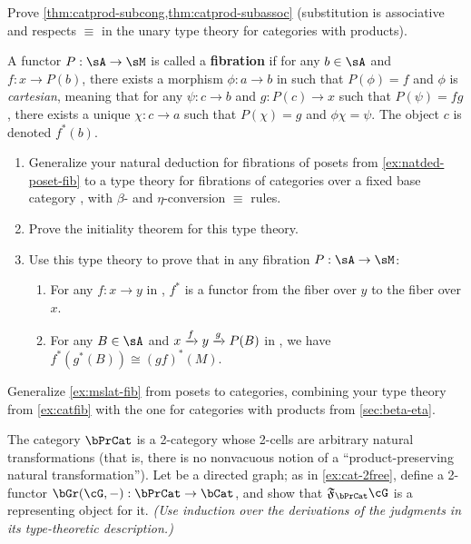 \begin{ex}\label{ex:catprod-subcong-subassoc}
  Prove \cref{thm:catprod-subcong,thm:catprod-subassoc} (substitution is associative and respects $\equiv$ in the unary type theory for categories with products).
\end{ex}

\begin{ex}\label{ex:catfib}
  A functor $P:\sA\to \sM$ is called a \textbf{fibration} if for any $b\in \sA$ and $f:x\to P(b)$, there exists a morphism $\phi:a\to b$ in \sA such that $P(\phi)=f$ and $\phi$ is \emph{cartesian}, meaning that for any $\psi:c\to b$ and $g:P(c)\to x$ such that $P(\psi)=fg$, there exists a unique $\chi:c\to a$ such that $P(\chi)=g$ and $\phi\chi=\psi$.
  The object $c$ is denoted $f^*(b)$.
  \begin{enumerate}
  \item Generalize your natural deduction for fibrations of posets from \cref{ex:natded-poset-fib} to a type theory for fibrations of categories over a fixed base category \sM, with $\beta$- and $\eta$-conversion $\equiv$ rules.
  \item Prove the initiality theorem for this type theory.
  \item Use this type theory to prove that in any fibration $P:\sA\to\sM$:
    \begin{enumerate}
    \item For any $f:x\to y$ in \sM, $f^*$ is a functor from the fiber over $y$ to the fiber over $x$.
    \item For any $B\in \sA$ and $x\xrightarrow{f} y \xrightarrow{g} P(B)$ in \sM, we have $f^*(g^*(B)) \cong (gf)^*(M)$.
    \end{enumerate}
  \end{enumerate}
\end{ex}

\begin{ex}\label{ex:catprod-fib}
  Generalize \cref{ex:mslat-fib} from posets to categories, combining your type theory from \cref{ex:catfib} with the one for categories with products from \cref{sec:beta-eta}.
\end{ex}

\begin{ex}\label{ex:catprod-2free}
  The category $\bPrCat$ is a 2-category whose 2-cells are arbitrary natural transformations (that is, there is no nonvacuous notion of a ``product-preserving natural transformation'').
  Let \cG be a directed graph; as in \cref{ex:cat-2free}, define a 2-functor $\bGr(\cG,-):\bPrCat\to\bCat$, and show that $\F\bPrCat\cG$ is a representing object for it.
  \textit{(Use induction over the derivations of the judgments in its type-theoretic description.)}
\end{ex}

